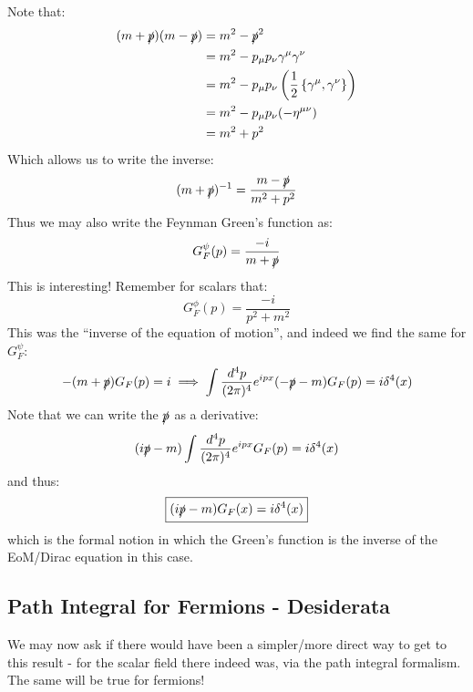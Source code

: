 Note that:
\begin{equation}
    \begin{split}
        (m + \slashed{p})(m - \slashed{p}) &= m^2 - \slashed{p}^2 
        \\ &= m^2 - p_\mu p_\nu \gamma^\mu \gamma^\nu
        \\ &= m^2 - p_\mu p_\nu \left(\frac{1}{2}\set{\gamma^\mu, \gamma^\nu}\right)
        \\ &= m^2 - p_\mu p_\nu (-\eta^{\mu\nu})
        \\ &= m^2 + p^2
    \end{split}
\end{equation}
Which allows us to write the inverse:
\begin{equation}
    (m + \slashed{p})^{-1} = \frac{m - \slashed{p}}{m^2 + p^2}
\end{equation}
Thus we may also write the Feynman Green's function as:
\begin{equation}
    G_F^\psi(p) = \frac{-i}{m + \slashed{p}}
\end{equation}
This is interesting! Remember for scalars that:
\begin{equation}
    G_F^\phi(p) = \frac{-i}{p^2 + m^2}
\end{equation}
This was the ``inverse of the equation of motion'', and indeed we find the same for $G^\psi_F$:
\begin{equation}
    -(m + \slashed{p})G_F(p) = i \implies \int \frac{d^4p}{(2\pi)^4}e^{ipx}(-\slashed{p} - m)G_F(p) = i\delta^4(x)
\end{equation}
Note that we can write the $\slashed{p}$ as a derivative:
\begin{equation}
    (i\slashed{p} - m)\int \frac{d^4p}{(2\pi)^4}e^{ipx}G_F(p) = i\delta^4(x)
\end{equation}
and thus:
\begin{equation}
    \boxed{(i\slashed{p} - m)G_F(x) = i\delta^4(x)}
\end{equation}
which is the formal notion in which the Green's function is the inverse of the EoM/Dirac equation in this case.

\subsection{Path Integral for Fermions - Desiderata}
We may now ask if there would have been a simpler/more direct way to get to this result - for the scalar field there indeed was, via the path integral formalism. The same will be true for fermions!

